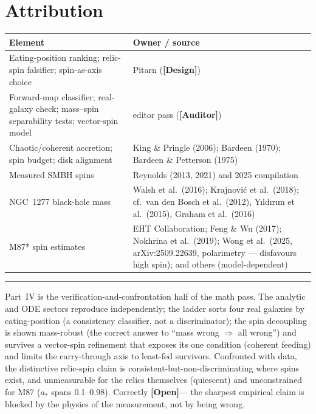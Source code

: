 \documentclass[11pt]{article}
\newcommand{\Design}{\textbf{\textcolor{purple!65!black}{[Design]}}}
\newcommand{\Open}{\textbf{\textcolor{gray!10!black}{[Open]}}}
\newcommand{\Auditor}{\textbf{\textcolor{teal!55!black}{[Auditor]}}}
\begin{document}
\section{Attribution}
\begin{center}\small
\begin{tabular}{@{}p{}p{}@{}}
\toprule
Element & Owner / source \\
\midrule
Eating-position ranking; relic-spin falsifier; spin-as-axis choice & Pitarn (\Design) \\
Forward-map classifier; real-galaxy check; mass--spin separability tests; vector-spin model & editor pass (\Auditor) \\
Chaotic/coherent accretion; spin budget; disk alignment & King \& Pringle (2006); Bardeen (1970); Bardeen \& Petterson (1975) \\
Measured SMBH spins & Reynolds (2013, 2021) and 2025 compilation \\
NGC~1277 black-hole mass & Walsh et al.\ (2016); Krajnovi\'c et al.\ (2018); cf.\ van den Bosch et al.\ (2012), Y\i ld\i r\i m et al.\ (2015), Graham et al.\ (2016) \\
M87* spin estimates & EHT Collaboration; Feng \& Wu (2017); Nokhrina et al.\ (2019); Wong et al.\ (2025, arXiv:2509.22639, polarimetry --- disfavours high spin); and others (model-dependent) \\
\bottomrule
\end{tabular}
\end{center}

\vspace{4pt}\hrule\vspace{4pt}
{\small Part~IV is the verification-and-confrontation half of the math pass. The analytic and ODE sectors reproduce independently; the ladder sorts four real galaxies by eating-position (a consistency classifier, not a discriminator); the spin decoupling is shown mass-robust (the correct answer to ``mass wrong $\Rightarrow$ all wrong'') and survives a vector-spin refinement that exposes its one condition (coherent feeding) and limits the carry-through axis to least-fed survivors. Confronted with data, the distinctive relic-spin claim is consistent-but-non-discriminating where spins exist, and unmeasurable for the relics themselves (quiescent) and unconstrained for M87 ($a_\ast$ spans 0.1--0.98). Correctly \Open --- the sharpest empirical claim is blocked by the physics of the measurement, not by being wrong.}
\end{document}
